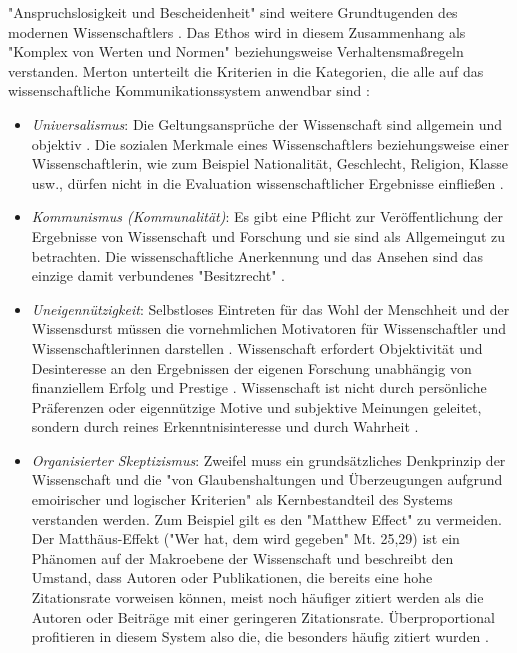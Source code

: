 "Anspruchslosigkeit und Bescheidenheit" sind weitere Grundtugenden des modernen Wissenschaftlers \cite{hagner_2015_sache_buches}. Das Ethos wird in diesem Zusammenhang als "Komplex von Werten und Normen" \cite{weingart1998wissenschafts} beziehungsweise Verhaltensmaßregeln verstanden. Merton unterteilt die Kriterien in die Kategorien, die alle auf das wissenschaftliche Kommunikationssystem anwendbar sind \cite{merton_1973} \cite{Fröhlich_oa_2009}:
\begin{itemize}
\item \textit{Universalismus}: Die Geltungsansprüche der Wissenschaft sind allgemein und objektiv \cite{Oezmen_2015}. Die sozialen Merkmale eines Wissenschaftlers beziehungsweise einer Wissenschaftlerin, wie zum Beispiel Nationalität, Geschlecht, Religion, Klasse usw., dürfen nicht in die Evaluation wissenschaftlicher Ergebnisse einfließen \cite{weingart1998wissenschafts}.
\item \textit{Kommunismus (Kommunalität)}: Es gibt eine Pflicht zur Veröffentlichung der Ergebnisse von Wissenschaft und Forschung und sie sind als Allgemeingut zu betrachten. Die wissenschaftliche Anerkennung und das Ansehen sind das einzige damit verbundenes "Besitzrecht" \cite{merton_1973}.
\item \textit{Uneigennützigkeit}: Selbstloses Eintreten für das Wohl der Menschheit und der Wissensdurst müssen die vornehmlichen Motivatoren für Wissenschaftler und Wissenschaftlerinnen darstellen \cite{weingart1998wissenschafts}. Wissenschaft erfordert Objektivität und Desinteresse an den Ergebnissen der eigenen Forschung \cite{merton_1973} unabhängig von finanziellem Erfolg und Prestige \cite{weingart1998wissenschafts}. Wissenschaft ist nicht durch persönliche Präferenzen oder eigennützige Motive und subjektive Meinungen geleitet, sondern durch reines Erkenntnisinteresse und durch Wahrheit \cite{Oezmen_2015}.
\item \textit{Organisierter Skeptizismus}: Zweifel muss ein grundsätzliches Denkprinzip der Wissenschaft \cite{merton_1973} und die "von Glaubenshaltungen und Überzeugungen aufgrund emoirischer und logischer Kriterien" \cite{weingart1998wissenschafts} als Kernbestandteil des Systems verstanden werden. Zum Beispiel gilt es den "Matthew Effect" zu vermeiden. Der Matthäus-Effekt ("Wer hat, dem wird gegeben" Mt. 25,29) ist ein Phänomen auf der Makroebene der Wissenschaft \cite{bonitz_1998_matthaus} und  beschreibt den Umstand, dass Autoren oder Publikationen, die bereits eine hohe Zitationsrate vorweisen können, meist noch häufiger zitiert werden als die Autoren oder Beiträge mit einer geringeren Zitationsrate. Überproportional profitieren in diesem System also die, die besonders häufig zitiert wurden \cite{Merton_1968} \cite{meier_2009_matthaus}.
\end{itemize}

